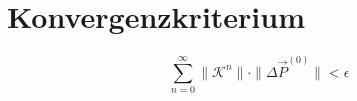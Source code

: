 \section{Konvergenzkriterium}
\[
\sum_{n=0}^\infty \|\mathcal{K}^n\| \cdot \|\Delta\vec{P}^{(0)}\| < \epsilon
\]